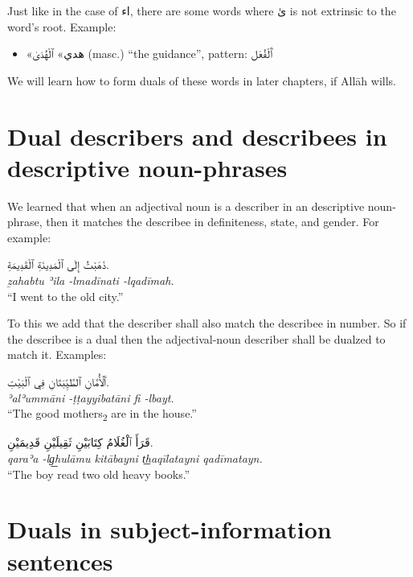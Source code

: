 \documentclass[
  10pt,
]{book}
\providecommand{\tightlist}{%
  \setlength{\itemsep}{0pt}\setlength{\parskip}{0pt}}
\begin{document}
Just like in the case of \foreignlanguage{arabic}{اء}, there are some words where \foreignlanguage{arabic}{ىٰ} is not extrinsic to the word's root.
Example:

\begin{itemize}
\tightlist
\item
  \foreignlanguage{arabic}{«هدي»} \foreignlanguage{arabic}{ٱلْهُدَىٰ} (masc.) \enquote{the guidance}, pattern: \foreignlanguage{arabic}{ٱَلْفُعَل}
\end{itemize}

We will learn how to form duals of these words in later chapters, if Allāh wills.

\section{Dual describers and describees in descriptive noun-phrases}\label{dual-describers-and-describees-in-descriptive-noun-phrases}

We learned that when an adjectival noun is a describer in an descriptive noun-phrase, then it matches the describee in definiteness, state, and gender. For example:

\foreignlanguage{arabic}{ذَهَبْتُ إِلَى ٱلْمَدِينَةِ ٱلْقَدِيمَةِ.}\\
\emph{ẕahabtu ʾila -lmadīnati -lqadīmah.}\\
\enquote{I went to the old city.}

To this we add that the describer shall also match the describee in number. So if the describee is a dual then the adjectival-noun describer shall be dualzed to match it. Examples:

\foreignlanguage{arabic}{ٱَلْأُمَّانِ ٱلطَّيِّبَتَانِ فِي ٱلْبَيْتِ.}\\
\emph{ʾalʾummāni -ṭṭayyibatāni fi -lbayt.}\\
\enquote{The good mothers\textsubscript{2} are in the house.}

\foreignlanguage{arabic}{قَرَأَ ٱلْغُلَامُ کِتَابَيْنِ ثَقِيلَيْنِ قَدِيمَيْنِ.}\\
\emph{qaraʾa -lg͟hulāmu kitābayni t͟haqīlatayni qadīmatayn.}\\
\enquote{The boy read two old heavy books.}

\section{Duals in subject-information sentences}\label{duals-in-subject-information-sentences}
\end{document}
